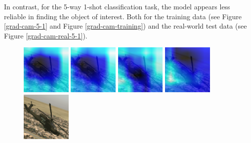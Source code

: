In contrast, for the 5-way 1-shot classification task, the model appears less reliable in finding the object of interest. Both for the training data (see Figure \ref{grad-cam-5-1} and Figure \ref{grad-cam-training}) and the real-world test data (see Figure \ref{grad-cam-real-5-1}). 

\begin{figure}[H]
\centering
{}
  {\includegraphics[height=2.4cm, width=2.4cm]{images/vbs3/gradcam/5-1/1/Heat_map_of_iterations_0.png}}
  {\includegraphics[height=2.4cm, width=2.4cm]{images/vbs3/gradcam/5-1/1/Heat_map_of_iterations_1.png}}
  {\includegraphics[height=2.4cm, width=2.4cm]{images/vbs3/gradcam/5-1/1/Heat_map_of_iterations_3.png}}
%
  {\includegraphics[height=2.4cm, width=2.4cm]{images/vbs3/gradcam/5-1/1/Heat_map_of_iterations_5.png}}
  {\includegraphics[height=2.4cm, width=2.4cm]{images/vbs3/gradcam/5-1/1/Test_Images.png}}



\end{figure}
